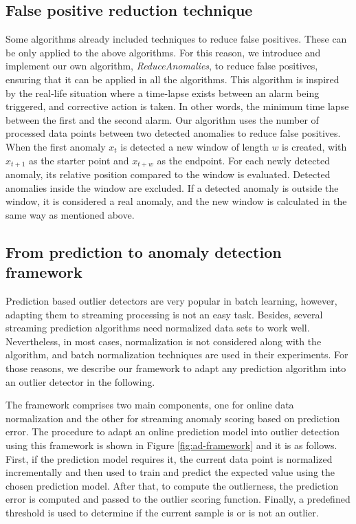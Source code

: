 \documentclass[a4paper]{article}\usepackage[]{graphicx}\usepackage[]{color}
\begin{document}
\subsection{False positive reduction technique} \label{sec:fp}

Some algorithms already included techniques to reduce false positives. These can be only applied to the above algorithms. For this reason, we introduce and implement our own algorithm, \emph{ReduceAnomalies}, to reduce false positives, ensuring that it can be applied in all the algorithms. This algorithm is inspired by the real-life situation where a time-lapse exists between an alarm being triggered, and corrective action is taken. In other words, the minimum time lapse between the first and the second alarm. Our algorithm uses the number of processed data points between two detected anomalies to reduce false positives. When the first anomaly $x_t$ is detected a new window of length $w$ is created, with $x_{t+1}$ as the starter point and $x_{t+w}$ as the endpoint. For each newly detected anomaly, its relative position compared to the window is evaluated. Detected anomalies inside the window are excluded. If a detected anomaly is outside the window, it is considered a real anomaly, and the new window is calculated in the same way as mentioned above.

\subsection{From prediction to anomaly detection framework} \label{sec:framework}

Prediction based outlier detectors are very popular in batch learning, however, adapting them to streaming processing is not an easy task. Besides, several streaming prediction algorithms need normalized data sets to work well. Nevertheless, in most cases, normalization is not considered along with the algorithm, and batch normalization techniques are used in their experiments. For those reasons, we describe our framework to adapt any prediction algorithm into an outlier detector in the following.

The framework comprises two main components, one for online data normalization and the other for streaming anomaly scoring based on prediction error. The procedure to adapt an online prediction model into outlier detection using this framework is shown in Figure \ref{fig:ad-framework} and it is as follows. First, if the prediction model requires it, the current data point is normalized incrementally and then used to train and predict the expected value using the chosen prediction model. After that, to compute the outlierness, the prediction error is computed and passed to the outlier scoring function. Finally, a predefined threshold is used to determine if the current sample is or is not an outlier.
\end{document}
